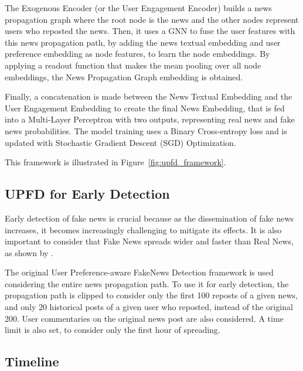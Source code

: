 \documentclass[12pt]{article}
\begin{document}
The Exogenous Encoder (or the User Engagement Encoder) builds a news propagation graph 
where the root node is the news and the other nodes represent users who reposted the news.
Then, it uses a GNN to fuse the user features with this news propagation path, 
by adding the news textual embedding and user preference embedding as node features, 
to learn the node embeddings. 
By applying a readout function that makes the mean pooling over all node embeddings, 
the News Propagation Graph embedding is obtained.

Finally, a concatenation is made between the News Textual Embedding and the User Engagement Embedding
to create the final News Embedding, that is fed into a Multi-Layer Perceptron with two outputs, representing
real news and fake news probabilities. 
The model training uses a Binary Cross-entropy loss and is updated with Stochastic Gradient Descent (SGD) Optimization.

This framework is illustrated in Figure~\ref{fig:upfd_framework}. 

\subsection{UPFD for Early Detection}

Early detection of fake news is crucial because as the dissemination of fake news increases, 
it becomes increasingly challenging to mitigate its effects. It is also important to consider that
Fake News spreads wider and faster than Real News, as shown by \cite{doi:10.1126/science.aap9559}.

The original User Preference-aware FakeNews Detection framework is used 
considering the entire news propagation path. 
To use it for early detection, the propagation path is clipped to consider only
the first 100 reposts of a given news, and only 20 historical posts of a given user who reposted, 
instead of the original 200. 
User commentaries on the original news post are also considered.
A time limit is also set, to consider only the first hour of spreading.


\subsection{Timeline}
\end{document}

